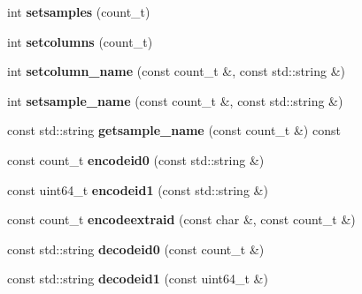 \begin{DoxyCompactItemize}
\item 
\hypertarget{classprofile_ad9a6314f5b5c9c1c68fb555faf443bee}{int {\bfseries setsamples} (count\-\_\-t)}\label{classprofile_ad9a6314f5b5c9c1c68fb555faf443bee}

\item 
\hypertarget{classprofile_a768e88d92581ef0f7432ae1e83487e05}{int {\bfseries setcolumns} (count\-\_\-t)}\label{classprofile_a768e88d92581ef0f7432ae1e83487e05}

\item 
\hypertarget{classprofile_aad49da8a92c55e53c236678a6797323f}{int {\bfseries setcolumn\-\_\-name} (const count\-\_\-t \&, const std\-::string \&)}\label{classprofile_aad49da8a92c55e53c236678a6797323f}

\item 
\hypertarget{classprofile_a46667541ccd87197eb4143311bb38a6e}{int {\bfseries setsample\-\_\-name} (const count\-\_\-t \&, const std\-::string \&)}\label{classprofile_a46667541ccd87197eb4143311bb38a6e}

\item 
\hypertarget{classprofile_ac90c9d2e224e477ea300abf6e86dfd31}{const std\-::string {\bfseries getsample\-\_\-name} (const count\-\_\-t \&) const }\label{classprofile_ac90c9d2e224e477ea300abf6e86dfd31}

\item 
\hypertarget{classprofile_abe096a4494739a3d0bfa94ef5a57f408}{const count\-\_\-t {\bfseries encodeid0} (const std\-::string \&)}\label{classprofile_abe096a4494739a3d0bfa94ef5a57f408}

\item 
\hypertarget{classprofile_a04d15aa05beabbae5dc14debf65412e5}{const uint64\-\_\-t {\bfseries encodeid1} (const std\-::string \&)}\label{classprofile_a04d15aa05beabbae5dc14debf65412e5}

\item 
\hypertarget{classprofile_aecbe5138b0570e29f4d21c754090462f}{const count\-\_\-t {\bfseries encodeextraid} (const char \&, const count\-\_\-t \&)}\label{classprofile_aecbe5138b0570e29f4d21c754090462f}

\item 
\hypertarget{classprofile_a14e855c712dcd98693968c8f00f76f29}{const std\-::string {\bfseries decodeid0} (const count\-\_\-t \&)}\label{classprofile_a14e855c712dcd98693968c8f00f76f29}

\item 
\hypertarget{classprofile_a33c98ef05a11807ed818815fd495193b}{const std\-::string {\bfseries decodeid1} (const uint64\-\_\-t \&)}\label{classprofile_a33c98ef05a11807ed818815fd495193b}


\end{DoxyCompactItemize}
